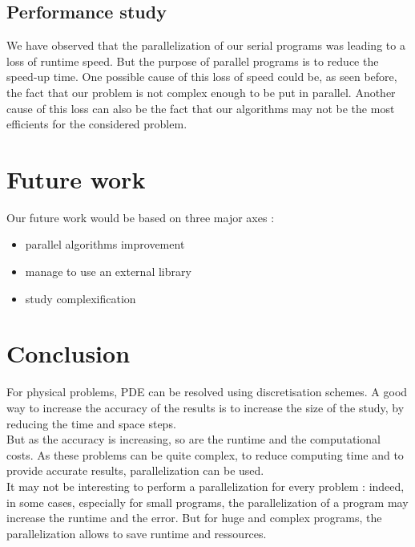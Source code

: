 \documentclass{article}
\begin{document}
            \subsection{Performance study}
                We have observed that the parallelization of our serial programs was leading to a loss of runtime speed. But 
                the purpose of parallel programs is to reduce the speed-up time.\cite{hptc} One possible cause of this loss
                of speed could be, as seen before, the fact that our problem is not complex enough to be put in parallel. Another
                cause of this loss can also be the fact that our algorithms may not be the most efficients for the considered problem.
        \newpage
        \section{Future work}
            Our future work would be based on three major axes : 
            \begin{itemize}
                \item{parallel algorithms improvement}
                \item{manage to use an external library}
                \item{study complexification}
            \end{itemize}
        \newpage
        \section{Conclusion}
            For physical problems, PDE can be resolved using discretisation schemes. A good way to increase the accuracy
            of the results is to increase the size of the study, by reducing the time and space steps. \\
            But 
            as the accuracy is increasing, so are the runtime and the computational costs. As these problems can be
            quite complex, to reduce computing time and to provide accurate results, parallelization can be used.\\
            It may not be interesting to perform a parallelization for every problem : indeed, in some cases, especially
            for small programs,
            the parallelization of a program may increase the runtime and the error. But for huge and complex
            programs, the parallelization allows to save runtime and ressources.\\
            
\end{document}
